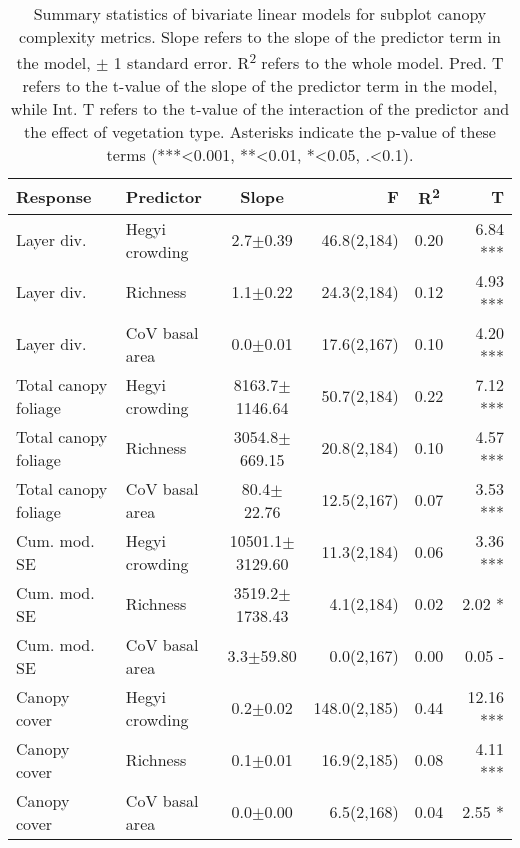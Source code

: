 \begin{table}
\centering
\begin{tabular}{llS[table-format=5.1(4.2)]rS[table-format=1.2]r}
  \hline
Response & Predictor & Slope & F & R\textsuperscript{2} & T \\ 
  \hline
Layer div. & Hegyi crowding & 2.7$\pm$0.39 & 46.8(2,184) & 0.20 & 6.84 *** \\ 
  Layer div. & Richness & 1.1$\pm$0.22 & 24.3(2,184) & 0.12 & 4.93 *** \\ 
  Layer div. & CoV basal area & 0.0$\pm$0.01 & 17.6(2,167) & 0.10 & 4.20 *** \\ 
  Total canopy foliage & Hegyi crowding & 8163.7$\pm$1146.64 & 50.7(2,184) & 0.22 & 7.12 *** \\ 
  Total canopy foliage & Richness & 3054.8$\pm$669.15 & 20.8(2,184) & 0.10 & 4.57 *** \\ 
  Total canopy foliage & CoV basal area & 80.4$\pm$22.76 & 12.5(2,167) & 0.07 & 3.53 *** \\ 
  Cum. mod. SE & Hegyi crowding & 10501.1$\pm$3129.60 & 11.3(2,184) & 0.06 & 3.36 *** \\ 
  Cum. mod. SE & Richness & 3519.2$\pm$1738.43 & 4.1(2,184) & 0.02 & 2.02 * \\ 
  Cum. mod. SE & CoV basal area & 3.3$\pm$59.80 & 0.0(2,167) & 0.00 & 0.05 - \\ 
  Canopy cover & Hegyi crowding & 0.2$\pm$0.02 & 148.0(2,185) & 0.44 & 12.16 *** \\ 
  Canopy cover & Richness & 0.1$\pm$0.01 & 16.9(2,185) & 0.08 & 4.11 *** \\ 
  Canopy cover & CoV basal area & 0.0$\pm$0.00 & 6.5(2,168) & 0.04 & 2.55 * \\ 
   \hline
\end{tabular}
\caption{Summary statistics of bivariate linear models for subplot canopy complexity metrics. Slope refers to the slope of the predictor term in the model, $\pm{}$ 1 standard error. R\textsuperscript{2} refers to the whole model. Pred. T refers to the t-value of the slope of the predictor term in the model, while Int. T refers to the t-value of the interaction of the predictor and the effect of vegetation type. Asterisks indicate the p-value of these terms (***<0.001, **<0.01, *<0.05, .<0.1).} 
\label{mod_bivar_lm_summ}
\end{table}

